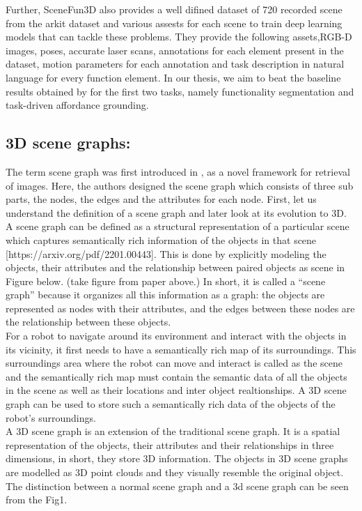 Further, SceneFun3D also provides a well difined dataset of 720 recorded scene from the arkit dataset and various assests for each scene 
to train deep learning models that can tackle these problems. They provide the following assets,RGB-D images, poses, accurate laser scans, 
annotations for each element present in the dataset, motion parameters for each annotation and task description in natural language for every function element.
In our thesis, we aim to beat the baseline results obtained by \citet{scenefun3D} for the first two tasks, namely 
functionality segmentation and task-driven affordance grounding. 

\subsection{3D scene graphs:}
The term scene graph was first introduced in \cite{7298990}, as a novel framework for retrieval of images. Here, the authors designed the scene graph which 
consists of three sub parts, the nodes, the edges and the attributes for each node. First, let us understand the definition of a scene graph and later
look at its evolution to 3D. \\
A scene graph can be defined as a structural representation of a particular scene which captures semantically rich information of the objects in that scene [https://arxiv.org/pdf/2201.00443].
This is done by explicitly modeling the objects, their attributes and the relationship between paired objects as scene in Figure below. (take figure from paper above.)
In short, it is called a “scene graph” because it organizes all this information as a graph: the objects are represented as nodes with their attributes, and the edges between these 
nodes are the relationship between these objects. \\

For a robot to navigate around its environment and interact with the objects in its vicinity, it first needs to have a semantically rich map of its surroundings. 
This surroundings area where the robot can move and interact is called as the scene and the semantically rich map must contain the 
semantic data of all the objects in the scene as well as their locations and inter object realtionships. 
A 3D scene graph can be used to store such a semantically rich data of the objects of the robot’s surroundings. \\

A 3D scene graph is an extension of the traditional scene graph. It is a spatial representation of the objects, their attributes 
and their relationships in three dimensions, in short, they store 3D information. The objects in 3D scene graphs are modelled as
 3D point clouds and they visually resemble the original object. The distinction between a normal scene graph and a 3d scene graph 
 can be seen from the Fig1. 

